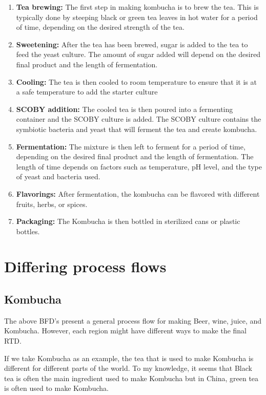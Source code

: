 \begin{enumerate}
  \item \textbf{Tea brewing: } The first step in making kombucha is to brew the tea. This is typically done by steeping black or green tea leaves in hot water for a period of time, depending on the desired strength of the tea.
  \item \textbf{Sweetening: } After the tea has been brewed, sugar is added to the tea to feed the yeast culture. The amount of sugar added will depend on the desired final product and the length of fermentation.
  \item \textbf{Cooling: }The tea is then cooled to room temperature to ensure that it is at a safe temperature to add the starter culture 
  \item \textbf{SCOBY addition: } The cooled tea is then poured into a fermenting container and the SCOBY culture is added. The SCOBY culture contains the symbiotic bacteria and yeast that will ferment the tea and create kombucha.
  \item \textbf{Fermentation: }The mixture is then left to ferment for a period of time, depending on the desired final product and the length of fermentation. The length of time depends on factors such as temperature, pH level, and the type of yeast and bacteria used.
  \item \textbf{Flavorings: }After fermentation, the kombucha can be flavored with different fruits, herbs, or spices.
  \item \textbf{Packaging: }The Kombucha is then bottled in sterilized cans or plastic bottles.
\end{enumerate}
\pagebreak
\section{Differing process flows}
\subsection{Kombucha}
The above BFD's present a general process flow for making Beer, wine, juice, and Kombucha. However, each region might have different ways to make the final RTD. \par

\vspace{0,3cm}
If we take Kombucha as an example, the tea that is used to make Kombucha is different for different parts of the world. To my knowledge, it seems that Black tea is often the main ingredient used to make Kombucha but in China, green tea is often used to make Kombucha. \par

